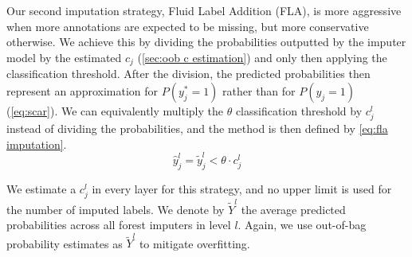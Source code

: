 \documentclass[conference,compsoc]{IEEEtran}
\newcommand{\el}[1]{_{#1}}
\begin{document}
Our second imputation strategy, Fluid Label Addition (FLA), is more aggressive when more annotations are expected to be missing, but more conservative otherwise.
We achieve this by dividing the probabilities outputted by the imputer model by the estimated $c_j$ (\autoref{sec:oob c estimation}) and only then applying the classification threshold. After the division, the predicted probabilities then represent an approximation for $P(y^\ast\el{j}=1)$ rather than for $P(y\el{j}=1)$ (\autoref{eq:scar}). We can equivalently multiply the $\theta$ classification threshold by $c_j^l$ instead of dividing the probabilities, and the method is then defined by \autoref{eq:fla imputation}.
%
%
%
\begin{equation}
    \hat y^{l}_j = \tilde y^l_j < \theta \cdot c_j^l
    \label{eq:fla imputation}
\end{equation}
%

We estimate a $c_j^l$ in every layer for this strategy, and no upper limit is used for the number of imputed labels.
We denote by $\tilde Y^l$ the average predicted probabilities across all forest imputers in level $l$. Again, we use out-of-bag probability estimates as $\tilde Y^l$ to mitigate overfitting.
\end{document}
